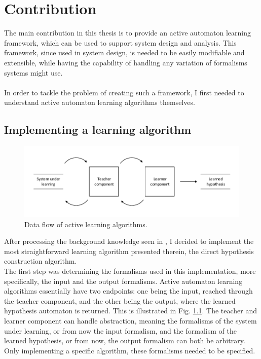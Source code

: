 \chapter{Contribution}

The main contribution in this thesis is to provide an active automaton learning framework, which can be used to support system design and analysis. This framework, since used in system design, is needed to be easily modifiable and extensible, while having the capability of handling any variation of formalisms systems might use.
\\\\
In order to tackle the problem of creating such a framework, I first needed to understand active automaton learning algorithms themselves.
\\
\section{Implementing a learning algorithm}

\begin{figure}
	\centering
	\includegraphics[width=1.0\linewidth]{figures/learningcomm}
	\caption{Data flow of active learning algorithms.}
	\label{fig:learningcomm}
\end{figure}

After processing the background knowledge seen in \cite{Steffen2011}, I decided to implement the most straightforward learning algorithm presented therein, the direct hypothesis construction algorithm.
\\
The first step was determining the formalisms used in this implementation, more specifically, the input and the output formalisms. Active automaton learning algorithms essentially have two endpoints: one being the input, reached through the teacher component, and the other being the output, where the learned hypothesis automaton is returned. This is illustrated in Fig. \ref{fig:learningcomm}. The teacher and learner component can handle abstraction, meaning the formalisms of the system under learning, or from now the input formalism, and the formalism of the learned hypothesis, or from now, the output formalism can both be arbitrary. Only implementing a specific algorithm, these formalisms needed to be specified. \\

